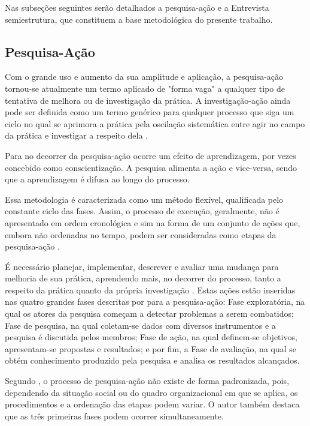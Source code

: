 Nas subseções seguintes serão detalhados a pesquisa-ação e a Entrevista semiestrutura, que constituem a base metodológica do presente trabalho.

\subsection{Pesquisa-Ação}

Com o grande uso e aumento da sua amplitude e aplicação, a pesquisa-ação tornou-se atualmente um termo aplicado de "forma vaga" a qualquer tipo de tentativa de melhora ou de investigação da prática. A investigação-ação ainda pode ser definida como um termo genérico para qualquer processo que siga um ciclo no qual se aprimora a prática pela oscilação sistemática entre agir no campo da prática e investigar a respeito dela \cite{tripp2005pesquisa}.

Para  no decorrer da pesquisa-ação ocorre um efeito de aprendizagem, por vezes concebido como conscientização. A pesquisa alimenta a ação e vice-versa, sendo que a aprendizagem é difusa ao longo do processo.

Essa metodologia é caracterizada como um método flexível, qualificada pelo constante ciclo das fases. Assim, o processo de execução, geralmente, não é apresentado em ordem cronológica e sim na forma de um conjunto de ações que, embora não ordenadas no tempo, podem ser consideradas como etapas da pesquisa-ação \cite{gil2002,thiollent2011metodologia}.

É necessário planejar, implementar, descrever e avaliar uma mudança para melhoria de sua prática, aprendendo mais, no decorrer do processo, tanto a respeito da prática quanto da própria investigação \cite{tripp2005pesquisa}. Estas ações estão inseridas nas quatro grandes fases descritas por  para a pesquisa-ação: Fase exploratória, na qual os atores da pesquisa começam a detectar problemas a serem combatidos; Fase de pesquisa, na qual coletam-se dados com diversos instrumentos e a pesquisa é discutida pelos membros; Fase de ação, na qual definem-se objetivos, apresentam-se propostas e resultados; e por fim, a Fase de avaliação, na qual se obtém conhecimento produzido pela pesquisa e analisa os resultados alcançados.

Segundo , o processo de pesquisa-ação não existe de forma padronizada, pois, dependendo da situação social ou do quadro organizacional em que se aplica, os procedimentos e a ordenação das etapas podem variar. O autor também destaca que as três primeiras fases podem ocorrer simultaneamente.

